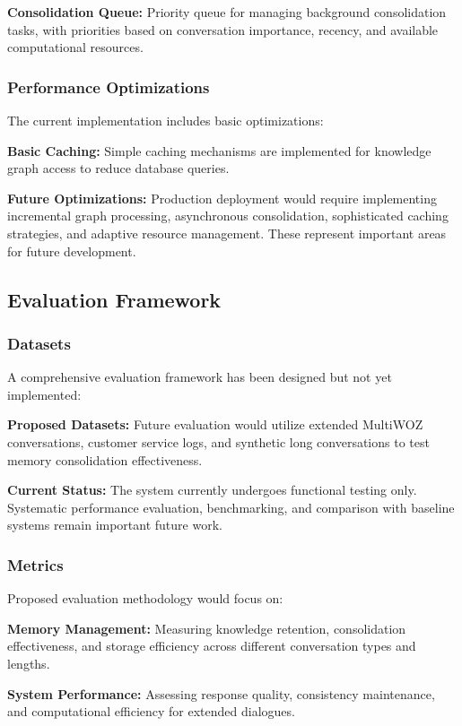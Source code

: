\documentclass[11pt]{article}
\begin{document}
\textbf{Consolidation Queue:} Priority queue for managing background consolidation tasks, with priorities based on conversation importance, recency, and available computational resources.

\subsubsection{Performance Optimizations}
The current implementation includes basic optimizations:

\textbf{Basic Caching:} Simple caching mechanisms are implemented for knowledge graph access to reduce database queries.

\textbf{Future Optimizations:} Production deployment would require implementing incremental graph processing, asynchronous consolidation, sophisticated caching strategies, and adaptive resource management. These represent important areas for future development.

\subsection{Evaluation Framework}

\subsubsection{Datasets}
A comprehensive evaluation framework has been designed but not yet implemented:

\textbf{Proposed Datasets:} Future evaluation would utilize extended MultiWOZ conversations, customer service logs, and synthetic long conversations to test memory consolidation effectiveness.

\textbf{Current Status:} The system currently undergoes functional testing only. Systematic performance evaluation, benchmarking, and comparison with baseline systems remain important future work.

\subsubsection{Metrics}
Proposed evaluation methodology would focus on:

\textbf{Memory Management:} Measuring knowledge retention, consolidation effectiveness, and storage efficiency across different conversation types and lengths.

\textbf{System Performance:} Assessing response quality, consistency maintenance, and computational efficiency for extended dialogues.
\end{document}
